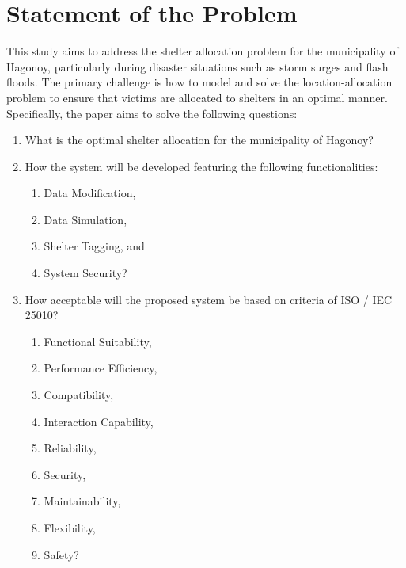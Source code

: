 \section{Statement of the Problem}

This study aims to address the shelter allocation problem for the municipality of Hagonoy, particularly during disaster situations such as storm surges and flash floods. The primary challenge is how to model and solve the location-allocation problem to ensure that victims are allocated to shelters in an optimal manner. Specifically, the paper aims to solve the following questions:

\begin{enumerate}
	\item What is the optimal shelter allocation for the municipality of Hagonoy?
	\item How the system will be developed featuring the following functionalities:
	\begin{enumerate}
		\item Data Modification,
		\item Data Simulation,
		\item Shelter Tagging, and
		\item System Security?
	\end{enumerate}
	\item How acceptable will the proposed system be based on criteria of ISO / IEC 25010?
	\begin{enumerate}
		\item Functional Suitability,
		\item Performance Efficiency,
		\item Compatibility,
		\item Interaction Capability,
		\item Reliability,
		\item Security,
		\item Maintainability,
		\item Flexibility,
		\item Safety?
	\end{enumerate}
\end{enumerate}